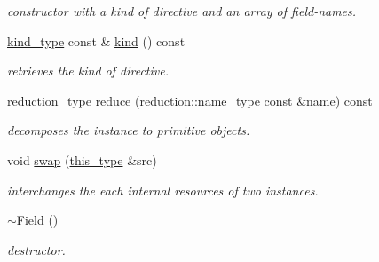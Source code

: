 \begin{DoxyCompactItemize}
\begin{DoxyCompactList}\small\item\em constructor with a kind of directive and an array of field-\/names. \end{DoxyCompactList}\item 
\hypertarget{classhryky_1_1http_1_1header_1_1cache_1_1directive_1_1_field_a295194a77be64b33ef94c65074d07e8c}{\hyperlink{classhryky_1_1_kind}{kind\-\_\-type} const \& \hyperlink{classhryky_1_1http_1_1header_1_1cache_1_1directive_1_1_field_a295194a77be64b33ef94c65074d07e8c}{kind} () const }\label{classhryky_1_1http_1_1header_1_1cache_1_1directive_1_1_field_a295194a77be64b33ef94c65074d07e8c}

\begin{DoxyCompactList}\small\item\em retrieves the kind of directive. \end{DoxyCompactList}\item 
\hypertarget{classhryky_1_1http_1_1header_1_1cache_1_1directive_1_1_field_a3d3c32af6c96a01c4720a09bb4a1ba1e}{\hyperlink{namespacehryky_a343a9a4c36a586be5c2693156200eadc}{reduction\-\_\-type} \hyperlink{classhryky_1_1http_1_1header_1_1cache_1_1directive_1_1_field_a3d3c32af6c96a01c4720a09bb4a1ba1e}{reduce} (\hyperlink{namespacehryky_1_1reduction_ac686c30a4c8d196bbd0f05629a6b921f}{reduction\-::name\-\_\-type} const \&name) const }\label{classhryky_1_1http_1_1header_1_1cache_1_1directive_1_1_field_a3d3c32af6c96a01c4720a09bb4a1ba1e}

\begin{DoxyCompactList}\small\item\em decomposes the instance to primitive objects. \end{DoxyCompactList}\item 
\hypertarget{classhryky_1_1http_1_1header_1_1cache_1_1directive_1_1_field_a0d2c3ec5b08b2bec8b59acd3de77b4c0}{void \hyperlink{classhryky_1_1http_1_1header_1_1cache_1_1directive_1_1_field_a0d2c3ec5b08b2bec8b59acd3de77b4c0}{swap} (\hyperlink{classhryky_1_1http_1_1header_1_1cache_1_1directive_1_1_field_a16b4bc99411398b23b073f022a730d10}{this\-\_\-type} \&src)}\label{classhryky_1_1http_1_1header_1_1cache_1_1directive_1_1_field_a0d2c3ec5b08b2bec8b59acd3de77b4c0}

\begin{DoxyCompactList}\small\item\em interchanges the each internal resources of two instances. \end{DoxyCompactList}\item 
\hypertarget{classhryky_1_1http_1_1header_1_1cache_1_1directive_1_1_field_adfce146a263140feca0c321924a743fd}{\hyperlink{classhryky_1_1http_1_1header_1_1cache_1_1directive_1_1_field_adfce146a263140feca0c321924a743fd}{$\sim$\-Field} ()}\label{classhryky_1_1http_1_1header_1_1cache_1_1directive_1_1_field_adfce146a263140feca0c321924a743fd}

\begin{DoxyCompactList}\small\item\em destructor. \end{DoxyCompactList}\end{DoxyCompactItemize}
